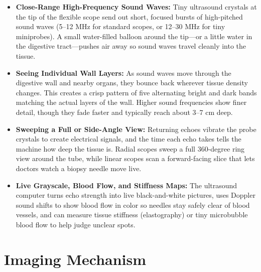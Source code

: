 \begin{itemize}
    \item \textbf{Close-Range High-Frequency Sound Waves:} Tiny ultrasound crystals at the tip of the flexible scope send out short, focused bursts of high-pitched sound waves (5--12 MHz for standard scopes, or 12--30 MHz for tiny miniprobes). A small water-filled balloon around the tip---or a little water in the digestive tract---pushes air away so sound waves travel cleanly into the tissue.
    \item \textbf{Seeing Individual Wall Layers:} As sound waves move through the digestive wall and nearby organs, they bounce back wherever tissue density changes. This creates a crisp pattern of five alternating bright and dark bands matching the actual layers of the wall. Higher sound frequencies show finer detail, though they fade faster and typically reach about 3--7 cm deep.
    \item \textbf{Sweeping a Full or Side-Angle View:} Returning echoes vibrate the probe crystals to create electrical signals, and the time each echo takes tells the machine how deep the tissue is. Radial scopes sweep a full 360-degree ring view around the tube, while linear scopes scan a forward-facing slice that lets doctors watch a biopsy needle move live.
    \item \textbf{Live Grayscale, Blood Flow, and Stiffness Maps:} The ultrasound computer turns echo strength into live black-and-white pictures, uses Doppler sound shifts to show blood flow in color so needles stay safely clear of blood vessels, and can measure tissue stiffness (elastography) or tiny microbubble blood flow to help judge unclear spots.
\end{itemize}

\section{Imaging Mechanism}

